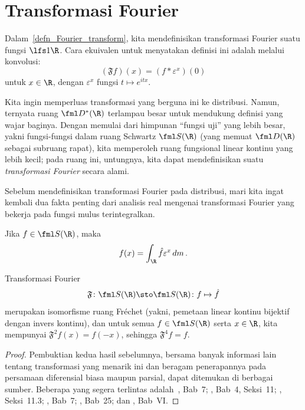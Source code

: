 \section{Transformasi Fourier}\label{section_Fourier_transform}

Dalam~\ref{defn_Fourier_transform}, kita mendefinisikan transformasi Fourier suatu fungsi $\lfs 1\R$. Cara ekuivalen untuk menyatakan
definisi ini adalah melalui konvolusi:
  \[ (\mathfrak F f)(x) = (f \ast \varepsilon^x)(0) \]
untuk $x \in \R$, dengan $\varepsilon^x$ fungsi $t \mapsto e^{itx}$.

\begin{defn} Kita ingin memperluas transformasi yang berguna ini ke distribusi. Namun, ternyata ruang $\fml D^*(\R)$ terlampau besar
untuk mendukung definisi yang wajar baginya. Dengan memulai dari himpunan ``fungsi uji'' yang lebih besar, yakni fungsi-fungsi dalam ruang Schwartz
$\fml S(\R)$ (yang memuat $\fml D(\R)$ sebagai subruang rapat), kita memperoleh ruang fungsional linear kontinu yang lebih kecil; pada ruang ini, untungnya, kita
dapat mendefinisikan suatu \emph{transformasi Fourier} secara alami.
\end{defn}

Sebelum mendefinisikan transformasi Fourier pada distribusi, mari kita ingat kembali dua fakta penting dari analisis real mengenai
transformasi Fourier yang bekerja pada fungsi mulus terintegralkan.

\begin{prop} Jika $f \in \fml S(\R)$,
maka
   \[ f(x) = \int_\R \hat f \varepsilon^x\,dm\,. \]
\end{prop}

\begin{prop}\label{prop_FT_isomor1} Transformasi Fourier
   \[ \mathfrak F\colon \fml S(\R) \sto \fml S(\R)\colon f \mapsto \hat f \]
merupakan isomorfisme ruang Fr\'echet (yakni, pemetaan linear kontinu bijektif dengan invers kontinu), dan untuk semua
$f \in \fml S(\R)$ serta $x \in \R$, kita mempunyai $\mathfrak F^2f(x) = f(-x)$, sehingga $\mathfrak F^4f = f$.
\end{prop}

\begin{proof} Pembuktian kedua hasil sebelumnya, bersama banyak informasi lain tentang transformasi yang menarik ini
dan beragam penerapannya pada persamaan diferensial biasa maupun parsial, dapat ditemukan di berbagai sumber.
Beberapa yang segera terlintas adalah~\cite{Cerda:2010}, Bab~7; \cite{Horvath:1966}, Bab~4, Seksi~11;
\cite{McDonaldW:1999}, Seksi~11.3; \cite{Rudin:1991}, Bab~7; \cite{Treves:1967}, Bab~25; dan \cite{Yosida:1965},
Bab~VI.   \ns
\end{proof}

